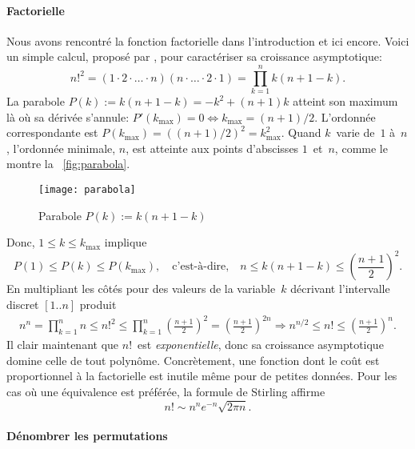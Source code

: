 \paragraph{Factorielle}

Nous avons rencontré la fonction factorielle dans l'introduction et
ici encore. Voici un simple calcul, proposé par
\cite{GrahamKnuthPatashnik_1994}, pour caractériser sa croissance
asymptotique:
\begin{equation*}
n!^2 = (1 \cdot 2 \cdot \ldots \cdot n) (n \cdot \ldots \cdot 2 \cdot
1) = \prod_{k=1}^{n}{k(n+1-k)}.
\end{equation*}
La parabole \(P(k) := k(n+1-k) = -k^2 + (n+1)k\) atteint son maximum
là où sa dérivée s'annule: \(P'(k_{\max}) = 0 \Leftrightarrow
k_{\max}=(n+1)/2\). L'ordonnée correspondante est \(P(k_{\max}) =
((n+1)/2)^2 = k_{\max}^2\). Quand \(k\)~varie de~\(1\) à~\(n\),
l'ordonnée minimale, \(n\), est atteinte aux points d'abscisses
\(1\)~et~\(n\), comme le montre la \fig~\vref{fig:parabola}.
\begin{figure}
\centering
\texttt{[image: parabola]}
\caption{Parabole \(P(k) := k(n+1-k)\)}
\label{fig:parabola}
\end{figure}
Donc, \(1 \leqslant k \leqslant k_{\max}\) implique
\begin{equation*}
P(1) \leqslant P(k) \leqslant P(k_{\max}),\quad \text{c'est-à-dire,}
\quad n \leqslant k(n+1-k) \leqslant \left(\frac{n+1}{2}\right)^2.
\end{equation*}
En multipliant les côtés pour des valeurs de la variable~\(k\)
décrivant l'intervalle discret \([1..n]\) produit
\begin{gather*}
n^n = \prod_{k=1}^{n}{n} \leqslant n!^2
\leqslant
\prod_{k=1}^{n}{\left(\!\frac{n+1}{2}\!\right)^2} \!\!=
\left(\!\frac{n+1}{2}\!\right)^{2n}
\!\!\!\Rightarrow\!
n^{n/2} \leqslant n! \leqslant \left(\!\frac{n+1}{2}\!\right)^n.
\end{gather*}
Il clair maintenant que \(n!\)~est \emph{exponentielle}, donc sa
croissance asymptotique domine celle de tout polynôme. Concrètement,
une fonction dont le coût est proportionnel à la factorielle est
inutile même pour de petites données. Pour les cas où une équivalence
est préférée, la formule de Stirling
affirme
\begin{equation}
n! \sim n^n e^{-n} \sqrt{2\pi n}.\label{eq:Stirling}
\end{equation}

\paragraph{Dénombrer les permutations}

